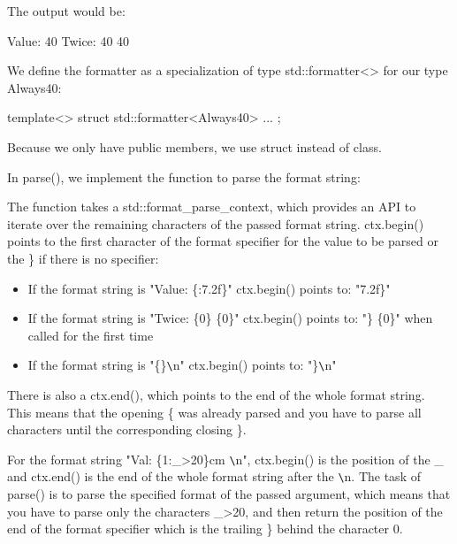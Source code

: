 The output would be:

\begin{shell}
Value: 40
Twice: 40 40
\end{shell}

We define the formatter as a specialization of type std::formatter<> for our type Always40:

\begin{cpp}
template<>
struct std::formatter<Always40>
{
	...
};
\end{cpp}

Because we only have public members, we use struct instead of class.



In parse(), we implement the function to parse the format string:

\begin{cpp}
// parse the format string for this type:
constexpr auto parse(std::format_parse_context& ctx) {
	return ctx.begin(); // return position of } (hopefully there)
}
\end{cpp}

The function takes a std::format\_parse\_context, which provides an API to iterate over the remaining characters of the passed format string. ctx.begin() points to the first character of the format specifier for the value to be parsed or the \} if there is no specifier:

\begin{itemize}
\item
If the format string is "Value: \{:7.2f\}"
ctx.begin() points to: "7.2f\}"

\item
If the format string is "Twice: \{0\} \{0\}"
ctx.begin() points to: "\} \{0\}"
when called for the first time

\item
If the format string is "\{\}\verb|\|n"
ctx.begin() points to: "\}\verb|\|n"
\end{itemize}

There is also a ctx.end(), which points to the end of the whole format string. This means that the opening \{ was already parsed and you have to parse all characters until the corresponding closing \}.

For the format string "Val: \{1:\_>20\}cm \verb|\|n", ctx.begin() is the position of the \_ and ctx.end() is the end of the whole format string after the \verb|\|n. The task of parse() is to parse the specified format of the passed argument, which means that you have to parse only the characters \_>20, and then return the position of the end of the format specifier which is the trailing \} behind the character 0.

